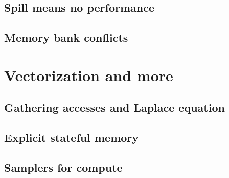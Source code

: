 \documentclass[a4paper,12pt,oneside]{article}
\begin{document}
\subsection{Spill means no performance}\label{subsec:Spills}


\subsection{Memory bank conflicts}\label{subsec:Banks}


\section{Vectorization and more}\label{sec:Vectors}


\subsection{Gathering accesses and Laplace equation}\label{subsec:Laplace}


\subsection{Explicit stateful memory}\label{subsec:Stateful}


\subsection{Samplers for compute}\label{subsec:Samplers}

\end{document}
